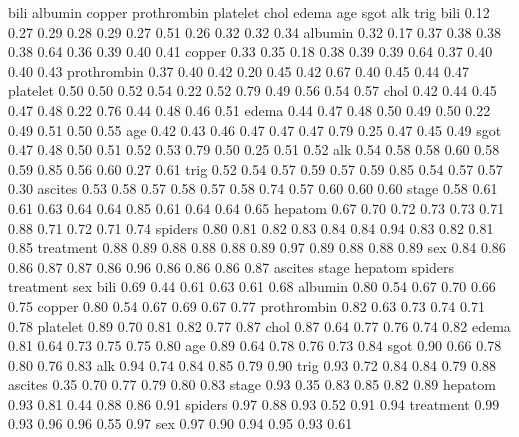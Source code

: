 \documentclass[article]{jss}
\begin{document}
\begin{Schunk}
\begin{Soutput}
            bili albumin copper prothrombin platelet chol edema  age sgot  alk trig
bili        0.12    0.27   0.29        0.28     0.29 0.27  0.51 0.26 0.32 0.32 0.34
albumin     0.32    0.17   0.37        0.38     0.38 0.38  0.64 0.36 0.39 0.40 0.41
copper      0.33    0.35   0.18        0.38     0.39 0.39  0.64 0.37 0.40 0.40 0.43
prothrombin 0.37    0.40   0.42        0.20     0.45 0.42  0.67 0.40 0.45 0.44 0.47
platelet    0.50    0.50   0.52        0.54     0.22 0.52  0.79 0.49 0.56 0.54 0.57
chol        0.42    0.44   0.45        0.47     0.48 0.22  0.76 0.44 0.48 0.46 0.51
edema       0.44    0.47   0.48        0.50     0.49 0.50  0.22 0.49 0.51 0.50 0.55
age         0.42    0.43   0.46        0.47     0.47 0.47  0.79 0.25 0.47 0.45 0.49
sgot        0.47    0.48   0.50        0.51     0.52 0.53  0.79 0.50 0.25 0.51 0.52
alk         0.54    0.58   0.58        0.60     0.58 0.59  0.85 0.56 0.60 0.27 0.61
trig        0.52    0.54   0.57        0.59     0.57 0.59  0.85 0.54 0.57 0.57 0.30
ascites     0.53    0.58   0.57        0.58     0.57 0.58  0.74 0.57 0.60 0.60 0.60
stage       0.58    0.61   0.61        0.63     0.64 0.64  0.85 0.61 0.64 0.64 0.65
hepatom     0.67    0.70   0.72        0.73     0.73 0.71  0.88 0.71 0.72 0.71 0.74
spiders     0.80    0.81   0.82        0.83     0.84 0.84  0.94 0.83 0.82 0.81 0.85
treatment   0.88    0.89   0.88        0.88     0.88 0.89  0.97 0.89 0.88 0.88 0.89
sex         0.84    0.86   0.86        0.87     0.87 0.86  0.96 0.86 0.86 0.86 0.87
            ascites stage hepatom spiders treatment  sex
bili           0.69  0.44    0.61    0.63      0.61 0.68
albumin        0.80  0.54    0.67    0.70      0.66 0.75
copper         0.80  0.54    0.67    0.69      0.67 0.77
prothrombin    0.82  0.63    0.73    0.74      0.71 0.78
platelet       0.89  0.70    0.81    0.82      0.77 0.87
chol           0.87  0.64    0.77    0.76      0.74 0.82
edema          0.81  0.64    0.73    0.75      0.75 0.80
age            0.89  0.64    0.78    0.76      0.73 0.84
sgot           0.90  0.66    0.78    0.80      0.76 0.83
alk            0.94  0.74    0.84    0.85      0.79 0.90
trig           0.93  0.72    0.84    0.84      0.79 0.88
ascites        0.35  0.70    0.77    0.79      0.80 0.83
stage          0.93  0.35    0.83    0.85      0.82 0.89
hepatom        0.93  0.81    0.44    0.88      0.86 0.91
spiders        0.97  0.88    0.93    0.52      0.91 0.94
treatment      0.99  0.93    0.96    0.96      0.55 0.97
sex            0.97  0.90    0.94    0.95      0.93 0.61
\end{Soutput}
\end{Schunk}
\end{document}
